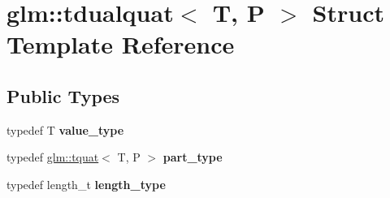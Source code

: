 \hypertarget{structglm_1_1tdualquat}{}\section{glm\+:\+:tdualquat$<$ T, P $>$ Struct Template Reference}
\label{structglm_1_1tdualquat}
\subsection*{Public Types}
\begin{DoxyCompactItemize}
\item 
\mbox{\label{structglm_1_1tdualquat_afcff3aadbc6e5c5672e2af653a5e401c}} 
typedef T {\bfseries value\+\_\+type}
\item 
\mbox{\label{structglm_1_1tdualquat_a496a3e08262a28863cf7b0609eee7e5b}} 
typedef \hyperlink{structglm_1_1tquat}{glm\+::tquat}$<$ T, P $>$ {\bfseries part\+\_\+type}
\item 
\mbox{\label{structglm_1_1tdualquat_a8100706ca94a1aa6611874787a9be0ca}} 
typedef length\+\_\+t {\bfseries length\+\_\+type}
\end{DoxyCompactItemize}
